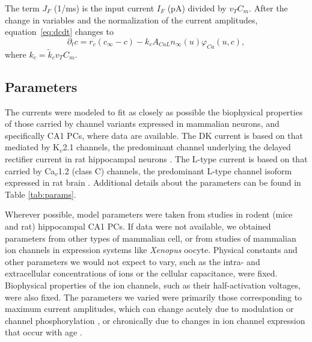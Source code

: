 \documentclass[12pt]{article}
\begin{document}
The term $J_{F}$ (1/ms) is the input current $I_F$ (pA) divided by $v_T C_m$. After the change in variables and the normalization of the current amplitudes,  equation~\eqref{eq:dcdt} changes to \begin{equation}
\partial_t{c} = r_{c}({c_{\infty} - c}) - k_{c} A_{CaL}n_{\infty}(u
) \varphi_{Ca}(u,c),
\label{eq:dcdt2}
\end{equation}
where $k_c = \tilde{k}_c v_T C_m$.

\subsection{Parameters}
The currents were modeled to fit as closely as possible the biophysical properties of those carried by channel variants expressed in mammalian neurons, and specifically CA1 PCs, where data are available. The DK current is based on that mediated by  K$_v$2.1 channels, the predominant channel underlying the delayed rectifier current in rat hippocampal neurons \cite{murakoshi1999identification}. The L-type {\Ca} current is based on that carried by Ca$_v$1.2 (class C) channels, the predominant L-type channel isoform expressed in rat brain \cite{hell1993identification}. Additional details about the parameters can be found in Table \ref{tab:params}.

Wherever possible, model parameters were taken from studies in rodent (mice and rat) hippocampal CA1 PCs. If data were not available, we obtained parameters from other types of mammalian cell, or from studies of mammalian ion channels in expression systems like \textit{Xenopus} oocyte. Physical constants and other parameters we would not expect to vary, such as the intra- and extracellular concentrations of ions or the cellular capacitance, were fixed. Biophysical properties of the ion channels, such as their half-activation voltages, were also fixed. The parameters we varied were primarily those corresponding to maximum current amplitudes, which can change acutely due to modulation or channel phosphorylation \citep{li1992functional,fadool1998modulation}, or chronically due to changes in ion channel expression that occur with age \citep{herman1998up,veng2002regionally}. 
\end{document}
